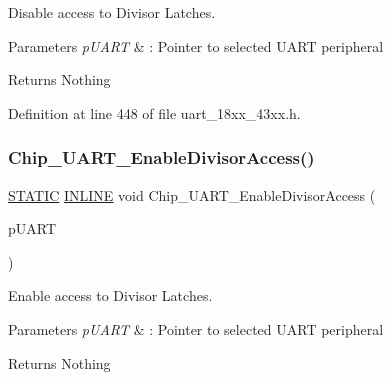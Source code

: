 Disable access to Divisor Latches. 


\begin{DoxyParams}{Parameters}
{\em p\+U\+A\+RT} & \+: Pointer to selected U\+A\+RT peripheral \\
\hline
\end{DoxyParams}
\begin{DoxyReturn}{Returns}
Nothing 
\end{DoxyReturn}


Definition at line 448 of file uart\+\_\+18xx\+\_\+43xx.\+h.

\mbox{\label{group___u_a_r_t__18_x_x__43_x_x_ga7a8e9260541ab5cacefcacbd94725d52}} 
\subsubsection{\texorpdfstring{Chip\+\_\+\+U\+A\+R\+T\+\_\+\+Enable\+Divisor\+Access()}{Chip\_UART\_EnableDivisorAccess()}}
{\footnotesize\ttfamily \hyperlink{group___l_p_c___types___public___macros_ga10b2d890d871e1489bb02b7e70d9bdfb}{S\+T\+A\+T\+IC} \hyperlink{spifi__18xx__43xx_8h_a2eb6f9e0395b47b8d5e3eeae4fe0c116}{I\+N\+L\+I\+NE} void Chip\+\_\+\+U\+A\+R\+T\+\_\+\+Enable\+Divisor\+Access (\begin{DoxyParamCaption}\item[{\hyperlink{struct_l_p_c___u_s_a_r_t___t}{L\+P\+C\+\_\+\+U\+S\+A\+R\+T\+\_\+T} $\ast$}]{p\+U\+A\+RT }\end{DoxyParamCaption})}



Enable access to Divisor Latches. 


\begin{DoxyParams}{Parameters}
{\em p\+U\+A\+RT} & \+: Pointer to selected U\+A\+RT peripheral \\
\hline
\end{DoxyParams}
\begin{DoxyReturn}{Returns}
Nothing 
\end{DoxyReturn}


